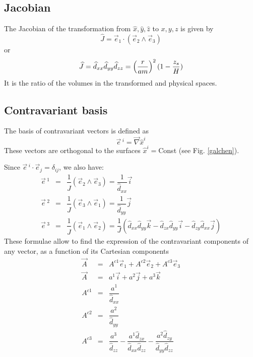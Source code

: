 \subsection{Jacobian}
The Jacobian of the transformation from $\widehat{x},\widehat{y},\widehat{z}$
to $x,y,z$ is given by
\begin{equation}
\widehat{J}  = \vec{e}_{1} \cdot ( \vec{e}_{2} \wedge  \vec{e}_{3})
\end{equation}
or
\begin{equation}
\widehat{J}  = \widehat{d}_{xx} \widehat{d}_{yy} \widehat{d}_{zz} = \left( {r\over am} \right)^2(1 - {z_s \over H})
\end{equation}
It is the ratio of the volumes in the transformed and physical spaces.

\subsection{Contravariant basis}

The basis of contravariant vectors is defined as
\begin{equation}
\vec{e}\, ^{i} = \vec{\nabla}\widehat{x}^{i}
\end{equation}
These vectors are orthogonal to the surfaces $\widehat{x}^{i}=$Const (see Fig.
\ref{galchen}).

Since $\vec{e}\, ^{i} \cdot \vec{e} _{j} = \delta_{ij}$, we also have:
\begin{eqnarray}
\vec{e}\, ^{1} & = & \dfrac{1}{\widehat{J}}(\vec{e} _{2} \wedge \vec{e} _{3}) =
\dfrac{1}{\widehat{d}_{xx}} \vec{i}
\nonumber \\
\vec{e}\, ^{2} & = & \dfrac{1}{\widehat{J}}(\vec{e} _{3} \wedge \vec{e} _{1}) =
\dfrac{1}{\widehat{d}_{yy}} \vec{j}
\\
\vec{e}\, ^{3} & = & \dfrac{1}{\widehat{J}}(\vec{e} _{1} \wedge \vec{e} _{2}) =
\dfrac{1}{J}\left(\widehat{d}_{xx} \widehat{d}_{yy} \vec{k}- \widehat{d}_{zx} \widehat{d}_{yy}\vec{i}
 - \widehat{d}_{zy} \widehat{d}_{xx}\vec{j}\right) \nonumber
\end{eqnarray}
These formulae allow to find the expression of the contravariant components
of any vector, as a function of its Cartesian components
\begin{eqnarray}
\vec{A} &=& A^{c1} \vec{e} _{1}+ A^{c2} \vec{e} _{2} + A^{c3} \vec{e} _{3}
\nonumber \\
\vec{A} &=& a^{1} \vec{i}+ a^{2} \vec{j} + a^{3} \vec{k} \nonumber \\
A^{c1}&  =& \dfrac{ a^1 }{\widehat{d}_{xx}} \\
A^{c2}&  =& \dfrac{ a^2 }{\widehat{d}_{yy}} \nonumber \\
A^{c3}&  =& \dfrac{ a^3 }{\widehat{d}_{zz}}- \dfrac{ a^1 \widehat{d}_{zx}}{\widehat{d}_{xx}\widehat{d}_{zz}}-
\dfrac{ a^2 \widehat{d}_{zy}}{\widehat{d}_{yy}\widehat{d}_{zz}} \nonumber
\end{eqnarray}

